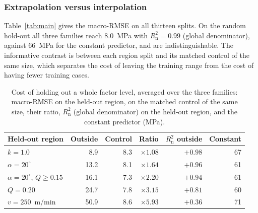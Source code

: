 \subsubsection{Extrapolation versus interpolation}
\label{sec:res_extrap}


Table~\ref{tab:main} gives the macro-RMSE on all thirteen splits. On the random hold-out all three families reach 8.0~MPa with $R^2_{\mathrm{n}}=0.99$ (global denominator), against 66~MPa for the constant predictor, and are indistinguishable. The informative contrast is between each region split and its matched control of the same size, which separates the cost of leaving the training range from the cost of having fewer training cases.

\begin{table}[t]
\caption{Cost of holding out a whole factor level, averaged over the three families: macro-RMSE on the held-out region, on the matched control of the same size, their ratio, $R^2_{\mathrm{n}}$ (global denominator) on the held-out region, and the constant predictor (MPa).} %
\label{tab:axis}
\centering\small
\begin{tabular}{@{}lrrrrr@{}}
\toprule
Held-out region & Outside & Control & Ratio & $R^2_{\mathrm{n}}$ outside & Constant \\
\midrule
$k=1.0$                              & 8.9  & 8.3 & $\times1.08$ & $+0.98$ & 67 \\
$\alpha=20^\circ$                    & 13.2 & 8.1 & $\times1.64$ & $+0.96$ & 61 \\
$\alpha=20^\circ$, $Q\ge0.15$        & 16.1 & 7.3 & $\times2.20$ & $+0.94$ & 61 \\
$Q=0.20$                             & 24.7 & 7.8 & $\times3.15$ & $+0.81$ & 60 \\
$v=250$~m/min                        & 50.9 & 8.6 & $\times5.93$ & $+0.36$ & 71 \\
\bottomrule
\end{tabular}
\end{table}

